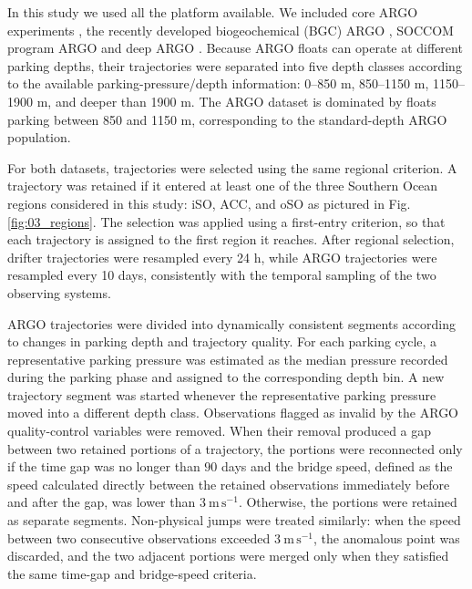 \documentclass[
  draft
]{agujournal2025}
\begin{document}
        In this study we used all the platform available. We included core ARGO experiments \cite{art:roemmich2019}, the recently developed biogeochemical (BGC) ARGO \cite{art:johnson2017, data:johnson2016}, SOCCOM program ARGO \cite{art:talley2019} and deep ARGO \cite{art:roemmich2019, art:owens2022}.
        Because ARGO floats can operate at different parking depths, their trajectories were separated into five depth classes according to the available parking-pressure/depth information: 0--850 m, 850--1150 m, 1150--1900 m, and deeper than 1900 m. The ARGO dataset is dominated by floats parking between 850 and 1150 m, corresponding to the standard-depth ARGO population.%
        
        For both datasets, trajectories were selected using the same regional criterion. A trajectory was retained if it entered at least one of the three Southern Ocean regions considered in this study: iSO, ACC, and oSO as pictured in Fig. \ref{fig:03_regions}. The selection was applied using a first-entry criterion, so that each trajectory is assigned to the first region it reaches. After regional selection, drifter trajectories were resampled every 24 h, while ARGO trajectories were resampled every 10 days, consistently with the temporal sampling of the two observing systems.

        ARGO trajectories were divided into dynamically consistent segments according to changes in parking depth and trajectory quality. For each parking cycle, a representative parking pressure was estimated as the median pressure recorded during the parking phase and assigned to the corresponding depth bin. A new trajectory segment was started whenever the representative parking pressure moved into a different depth class. Observations flagged as invalid by the ARGO quality-control variables were removed. When their removal produced a gap between two retained portions of a trajectory, the portions were reconnected only if the time gap was no longer than $90$ days and the bridge speed, defined as the speed calculated directly between the retained observations immediately before and after the gap, was lower than $3~\mathrm{m\,s^{-1}}$. Otherwise, the portions were retained as separate segments. Non-physical jumps were treated similarly: when the speed between two consecutive observations exceeded $3~\mathrm{m\,s^{-1}}$, the anomalous point was discarded, and the two adjacent portions were merged only when they satisfied the same time-gap and bridge-speed criteria.
        
\end{document}

